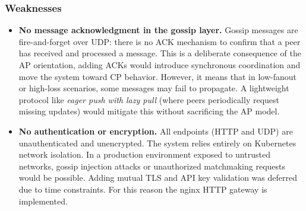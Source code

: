 \subsubsection{Weaknesses}

\begin{itemize}
  \item \textbf{No message acknowledgment in the gossip layer.} Gossip messages are fire-and-forget over UDP: there is no ACK mechanism to confirm that a peer has received and processed a message. This is a deliberate consequence of the AP orientation, adding ACKs would introduce synchronous coordination and move the system toward CP behavior. However, it means that in low-fanout or high-loss scenarios, some messages may fail to propagate. A lightweight protocol like \textit{eager push with lazy pull} (where peers periodically request missing updates) would mitigate this without sacrificing the AP model.

  \item \textbf{No authentication or encryption.} All endpoints (HTTP and UDP) are unauthenticated and unencrypted. The system relies entirely on Kubernetes network isolation. In a production environment exposed to untrusted networks, gossip injection attacks or unauthorized matchmaking requests would be possible. Adding mutual TLS and API key validation was deferred due to time constraints. For this reason the nginx HTTP gateway is implemented.
\end{itemize}
